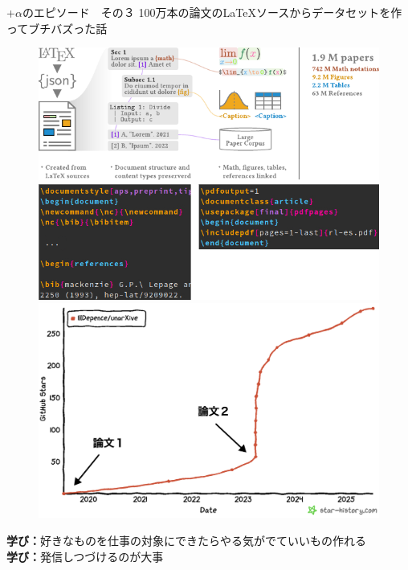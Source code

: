 \documentclass[lualatex,aspectratio=169]{beamer}
\begin{document}
\begin{frame}[t]{+$\alpha$のエピソード　その３}
    100万本の論文の\LaTeX{}ソースからデータセットを作ってブチバズった話
    \begin{figure}
        \begin{overprint}
            \begin{center}\includegraphics[height=0.45\textheight]{./img/unarxive_schema.pdf}\end{center}
            \begin{center}\includegraphics[height=0.45\textheight]{./img/weirdtex.png}\end{center}
            \begin{center}\includegraphics[height=0.45\textheight]{./img/unarxive_stars_annot.png}\end{center}
        \end{overprint}
    \end{figure}
    \textbf{学び：}好きなものを仕事の対象にできたらやる気がでていいもの作れる\\
 	\onslide<5>\textbf{学び：}発信しつづけるのが大事
\end{frame}
\end{document}
